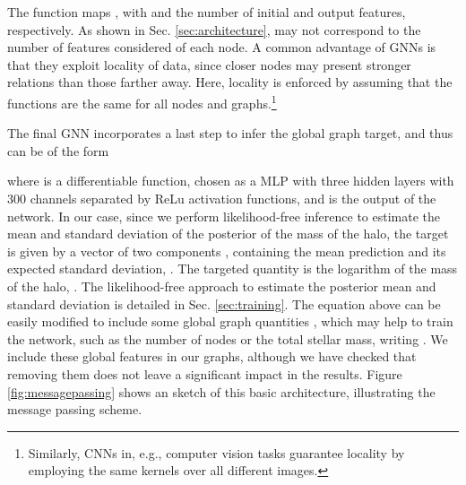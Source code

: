 \documentclass[twocolumn]{aastex631}
\begin{document}
The function  maps , with  and  the number of initial and output features, respectively. As shown in Sec. \ref{sec:architecture},  may not correspond to the number of features considered of each node. A common advantage of GNNs is that they exploit locality of data, since closer nodes may present stronger relations than those farther away. Here,  locality is enforced by assuming that the functions  are the same for all nodes and graphs.\footnote{Similarly, CNNs in, e.g., computer vision tasks guarantee locality by employing the same kernels over all different images.} 



The final GNN incorporates a last step to infer the global graph target, and thus can be of the form

where  is a differentiable function, chosen as a MLP with three hidden layers with 300 channels separated by ReLu activation functions, and  is the output of the network. In our case, since we perform likelihood-free inference to estimate the mean and standard deviation of the posterior of the mass of the halo, the target is given by a vector of two components , containing the mean prediction  and its expected standard deviation, . The targeted quantity is the logarithm of the mass of the halo, . The likelihood-free approach to estimate the posterior mean and standard deviation is detailed in Sec. \ref{sec:training}. The equation above can be easily modified to include some global graph quantities , which may help to train the network, such as the number of nodes or the total stellar mass, writing . We include these global features in our graphs, although we have checked that removing them does not leave a significant impact in the results. Figure \ref{fig:messagepassing} shows an sketch of this basic architecture, illustrating the message passing scheme.
\end{document}

